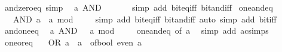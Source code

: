 \begin{isabellebody}
%
\endisadelimproof
\isanewline
{}\isamarkupfalse%
\ and{\isacharunderscore}{\kern0pt}zero{\isacharunderscore}{\kern0pt}eq\ {\isacharbrackleft}{\kern0pt}simp{\isacharbrackright}{\kern0pt}{\isacharcolon}{\kern0pt}\isanewline
\ \ {\isacartoucheopen}a\ AND\ {}\ {\isacharequal}{\kern0pt}\ {}{\isacartoucheclose}\isanewline
%
\isadelimproof
\ \ %
\endisadelimproof
%
\isatagproof
{}\isamarkupfalse%
\ {\isacharparenleft}{\kern0pt}simp\ add{\isacharcolon}{\kern0pt}\ bit{\isacharunderscore}{\kern0pt}eq{\isacharunderscore}{\kern0pt}iff\ bit{\isacharunderscore}{\kern0pt}and{\isacharunderscore}{\kern0pt}iff{\isacharparenright}{\kern0pt}%
\endisatagproof
{\isafoldproof}%
%
\isadelimproof
\isanewline
%
\endisadelimproof
\isanewline
{}\isamarkupfalse%
\ one{\isacharunderscore}{\kern0pt}and{\isacharunderscore}{\kern0pt}eq{\isacharcolon}{\kern0pt}\isanewline
\ \ {\isacartoucheopen}{}\ AND\ a\ {\isacharequal}{\kern0pt}\ a\ mod\ {}{\isacartoucheclose}\isanewline
%
\isadelimproof
\ \ %
\endisadelimproof
%
\isatagproof
{}\isamarkupfalse%
\ {\isacharparenleft}{\kern0pt}simp\ add{\isacharcolon}{\kern0pt}\ bit{\isacharunderscore}{\kern0pt}eq{\isacharunderscore}{\kern0pt}iff\ bit{\isacharunderscore}{\kern0pt}and{\isacharunderscore}{\kern0pt}iff{\isacharparenright}{\kern0pt}\ {\isacharparenleft}{\kern0pt}auto\ simp\ add{\isacharcolon}{\kern0pt}\ bit{\isacharunderscore}{\kern0pt}{}{\isacharunderscore}{\kern0pt}iff{\isacharparenright}{\kern0pt}%
\endisatagproof
{\isafoldproof}%
%
\isadelimproof
\isanewline
%
\endisadelimproof
\isanewline
{}\isamarkupfalse%
\ and{\isacharunderscore}{\kern0pt}one{\isacharunderscore}{\kern0pt}eq{\isacharcolon}{\kern0pt}\isanewline
\ \ {\isacartoucheopen}a\ AND\ {}\ {\isacharequal}{\kern0pt}\ a\ mod\ {}{\isacartoucheclose}\isanewline
%
\isadelimproof
\ \ %
\endisadelimproof
%
\isatagproof
{}\isamarkupfalse%
\ one{\isacharunderscore}{\kern0pt}and{\isacharunderscore}{\kern0pt}eq\ {\isacharbrackleft}{\kern0pt}of\ a{\isacharbrackright}{\kern0pt}\ \isamarkupfalse%
\ {\isacharparenleft}{\kern0pt}simp\ add{\isacharcolon}{\kern0pt}\ ac{\isacharunderscore}{\kern0pt}simps{\isacharparenright}{\kern0pt}%
\endisatagproof
{\isafoldproof}%
%
\isadelimproof
\isanewline
%
\endisadelimproof
\isanewline
{}\isamarkupfalse%
\ one{\isacharunderscore}{\kern0pt}or{\isacharunderscore}{\kern0pt}eq{\isacharcolon}{\kern0pt}\isanewline
\ \ {\isacartoucheopen}{}\ OR\ a\ {\isacharequal}{\kern0pt}\ a\ {\isacharplus}{\kern0pt}\ of{\isacharunderscore}{\kern0pt}bool\ {\isacharparenleft}{\kern0pt}even\ a{\isacharparenright}{\kern0pt}{\isacartoucheclose}\isanewline

\end{isabellebody}

